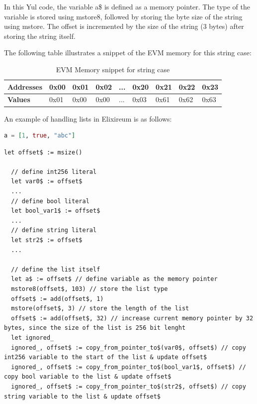 In this Yul code, the variable a\$ is defined as a memory pointer. The type of the variable is stored using mstore8, followed by storing the byte size of the string using mstore. The offset is incremented by the size of the string (3 bytes) after storing the string itself.

The following table illustrates a snippet of the EVM memory for this string case:

\begin{table}[h!]
  \centering
  \renewcommand{\arraystretch}{1.2} %
  \begin{tabular}{|>{\centering\arraybackslash}m{2cm}|>{\centering\arraybackslash}m{1cm}|>{\centering\arraybackslash}m{1cm}|>{\centering\arraybackslash}m{1cm}|>{\centering\arraybackslash}m{0.75cm}|>{\centering\arraybackslash}m{1cm}|>{\centering\arraybackslash}m{1cm}|>{\centering\arraybackslash}m{1cm}|>{\centering\arraybackslash}m{1cm}|}
  \hline
  \textbf{Addresses} & 0x00 & 0x01 & 0x02 & ... & 0x20 & 0x21 & 0x22 & 0x23 \\ \hline
  \textbf{Values}    & 0x01 & 0x00 & 0x00 & ... & 0x03 & 0x61 & 0x62 & 0x63 \\ \hline
  \end{tabular}
  \caption{EVM Memory snippet for string case}
  \label{tab:evm_memory}
  \end{table}

An example of handling lists in Elixireum is as follows:

\begin{lstlisting}[caption={Elixireum code for list case}, language=elixir]
  a = [1, true, "abc"]
\end{lstlisting}
  
\begin{lstlisting}[caption={Generated yul code for string case}, language=yul]
  let offset$ := msize()
  
  // define int256 literal
  let var0$ := offset$
  ...  
  // define bool literal
  let bool_var1$ := offset$
  ...
  // define string literal
  let str2$ := offset$
  ...
  
  // define the list itself
  let a$ := offset$ // define variable as the memory pointer
  mstore8(offset$, 103) // store the list type
  offset$ := add(offset$, 1)
  mstore(offset$, 3) // store the length of the list 
  offset$ := add(offset$, 32) // increase current memory pointer by 32 bytes, since the size of the list is 256 bit lenght
  let ignored_
  ignored_, offset$ := copy_from_pointer_to$(var0$, offset$) // copy int256 variable to the start of the list & update offset$
  ignored_, offset$ := copy_from_pointer_to$(bool_var1$, offset$) // copy bool variable to the list & update offset$
  ignored_, offset$ := copy_from_pointer_to$(str2$, offset$) // copy string variable to the list & update offset$
\end{lstlisting}

